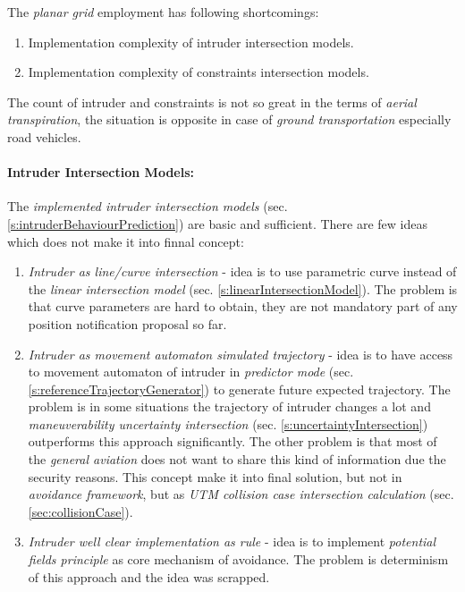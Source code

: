 \noindent The \emph{planar grid} employment has following shortcomings:
\begin{enumerate}
    \item Implementation complexity of intruder intersection models.
    \item Implementation complexity of constraints intersection models.
\end{enumerate}

\begin{note}
    The count of intruder and constraints is not so great in the terms of \emph{aerial transpiration}, the situation is opposite in case of \emph{ground transportation} especially road vehicles. 
\end{note}

\paragraph{Intruder Intersection Models:} The \emph{implemented intruder intersection models} (sec. \ref{s:intruderBehaviourPrediction}) are basic and sufficient. There are few ideas which does not make it into finnal concept:

\begin{enumerate}
    \item \emph{Intruder as line/curve intersection} - idea is to use parametric curve instead of the \emph{linear intersection model} (sec. \ref{s:linearIntersectionModel}). The problem is that curve parameters are hard to obtain, they are not mandatory part of any position notification proposal so far.
	
	\item \emph{Intruder as movement automaton simulated trajectory} - idea is to have access to movement automaton of intruder in \emph{predictor mode} (sec. \ref{s:referenceTrajectoryGenerator}) to generate future expected trajectory. The problem is in some situations the trajectory of intruder changes a lot and \emph{maneuverability uncertainty intersection} (sec. \ref{s:uncertaintyIntersection}) outperforms this approach significantly. The other problem is that most of the \emph{general aviation} does not want to share this kind of information due the security reasons.  This concept make it into final solution, but not in \emph{avoidance framework}, but as \emph{UTM collision case intersection calculation} (sec. \ref{sec:collisionCase}).
	
	\item \emph{Intruder well clear implementation as rule} - idea is to implement \emph{potential fields principle} as core mechanism of avoidance. The problem is determinism of this approach and the idea was scrapped.
\end{enumerate}

